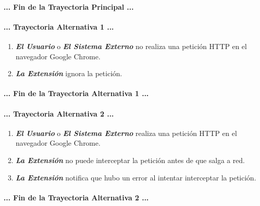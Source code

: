 \documentclass[12pt, a4paper, titlepage]{article}
\begin{document}
				\paragraph{... Fin de la Trayectoria Principal ...}
				
				\paragraph{... Trayectoria Alternativa 1 ...}
				\begin{enumerate}
					\item \textbf{\textit{El Usuario}} o \textbf{\textit{El Sistema Externo}} no realiza una petición HTTP en el navegador Google Chrome.\\
					\item \textbf{\textit{La Extensión}} ignora la petición.					
				\end{enumerate}
				\paragraph{... Fin de la Trayectoria Alternativa 1 ...}
				
				\paragraph{... Trayectoria Alternativa 2 ...}
				\begin{enumerate}
					\item \textbf{\textit{El Usuario}} o \textbf{\textit{El Sistema Externo}} realiza una petición HTTP en el navegador Google Chrome.\\
					\item \textbf{\textit{La Extensión}} no puede interceptar la petición antes de que salga a red.\\
					\item \textbf{\textit{La Extensión}} notifica que hubo un error al intentar interceptar la petición. 
				\end{enumerate}
				\paragraph{... Fin de la Trayectoria Alternativa 2 ...}
				
\end{document}
